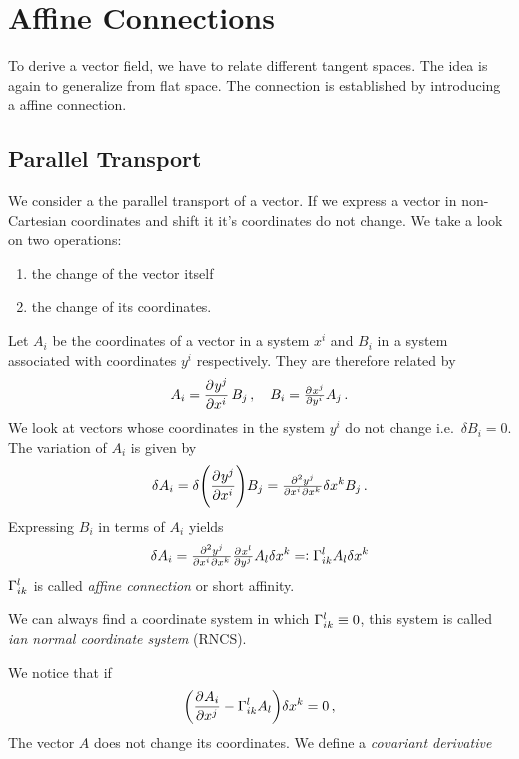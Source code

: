 \section{Affine Connections}
To derive a vector field, we have to relate different tangent spaces. The idea
is again to generalize from flat space. The connection is established by
introducing a affine connection.
\subsection{Parallel Transport}
We consider a the parallel transport of a
vector.
If we express a vector in non-Cartesian coordinates and shift it it's
coordinates do not change.
We take a look on two operations:
\begin{enumerate}
\item the change of the vector itself
\item the change of its coordinates.
\end{enumerate}
Let $A_i$ be the coordinates of a vector in a system $x^i$ and $B_i$ in a
system associated with coordinates $y^i$ respectively. They are therefore
related by
\begin{equation}
A_i=\dpd{{y^j}}{{x^i}}B_j\, ,\quad B_i=\pd{{x^j}}{{y^i}}A_j\, .
\end{equation}
We look at vectors whose coordinates in the system $y^i$ do not change i.e.\ 
$\delta B_i=0$. The variation of $A_i$ is given by
\begin{equation}
\delta
A_i=\delta\left(\dpd{{y^j}}{{x^i}}\right)B_j
=\md{{y^j}}{2}{{x^i}}{}{{x^k}}{}\delta
x^k B_j\, .
\end{equation}
Expressing $B_i$ in terms of $A_i$ yields
\begin{equation}
\delta A_i = \md{{y^j}}{2}{{x^i}}{}{{x^k}}{}\pd{{x^l}}{{y^j}}A_l\delta x^k
=:\affin{l}{i}{k}A_l\delta x^k
\end{equation}
$\Gamma^{l}_{i k}$ is called \emph{affine connection} or short affinity.
\begin{remark}
We can always find a coordinate system in which $\Gamma^{l}_{i k}\equiv 0$, this
system is called \emph{\name{Riemann}ian normal coordinate system} (RNCS).
\end{remark}
We notice that if 
\begin{equation}
\left(\dpd{{A_i}}{{x^j}}-\affin{l}{i}{k}A_l\right)\delta x^k = 0\,
,\label{eq:covdev}
\end{equation}
The vector $A$ does not change its coordinates. We define a \emph{covariant
derivative} 
